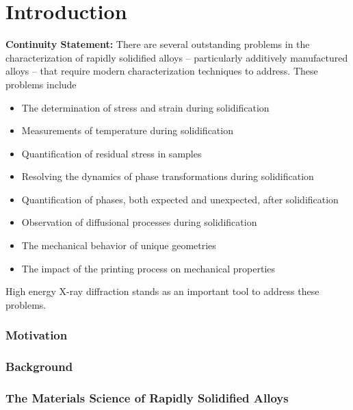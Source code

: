 \chapter{Introduction}
\textbf{Continuity Statement:}
There are several outstanding problems in the characterization of rapidly solidified alloys -- particularly additively manufactured alloys -- that require modern characterization techniques to address. These problems include
\begin{itemize}
	\item The determination of stress and strain during solidification
	\item Measurements of temperature during solidification
	\item Quantification of residual stress in samples
	\item Resolving the dynamics of phase transformations during solidification
	\item Quantification of phases, both expected and unexpected, after solidification
	\item Observation of diffusional processes during solidification
	\item The mechanical behavior of unique geometries
	\item The impact of the printing process on mechanical properties
\end{itemize}
High energy X-ray diffraction stands as an important tool to address these problems.

\subsection{Motivation}

\subsection{Background}

\subsection{The Materials Science of Rapidly Solidified Alloys}


